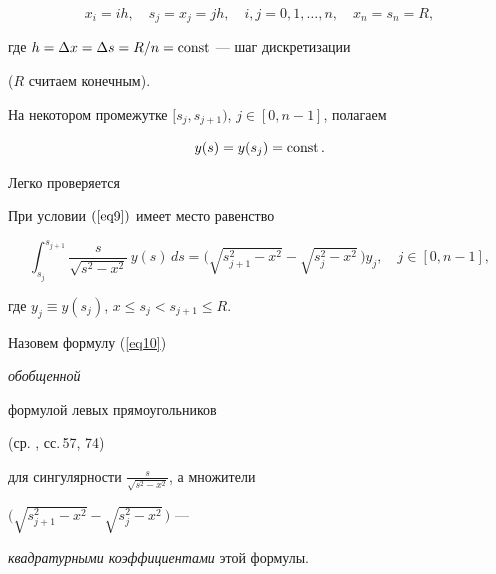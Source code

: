 \begin{equation}


\label{eq8}


x_i=ih, \quad s_j=x_j=jh, \quad i,j=0,1,\dotsc,n, \quad x_n=s_n=R,


\end{equation}


где $h=\Delta x=\Delta s=R/n=\operatorname{const}$ --- шаг дискретизации


($R$ считаем конечным).


На некотором промежутке $[s_j,s_{j+1})$, $j\in[0,n-1]$, полагаем


\begin{equation}


\label{eq9}


y(s)=y(s_j)=\const.


\end{equation}





Легко проверяется





\begin{lem}


При условии $(\ref{eq9})$ имеет место равенство


\begin{equation}


\label{eq10}


\int_{s_j}^{s_{j+1}}\frac{s}{\sqrt{s^2-x^2}}\,y(s)\,ds=


\big(\sqrt{s_{j+1}^2-x^2}-\sqrt{s_j^2-x^2}\,\big)y_j,


\quad j\in[0,n-1],


\end{equation}


где $y_j\equiv y(s_j)$, $x\le s_j<s_{j+1}\le R$.


\end{lem}








\begin{defn}


Назовем формулу (\ref{eq10}) {\it обобщенной


формулой левых прямоугольников} (ср. \cite{ksh}, сс.\,57, 74)


для сингулярности $\frac{s}{\sqrt{s^2-x^2}}$, а множители


$\big(\sqrt{s_{j+1}^2-x^2}-\sqrt{s_j^2-x^2}\,\big)$ ---


{\it квадратурными коэффициентами} этой формулы.


\end{defn}





